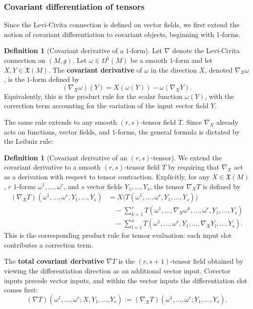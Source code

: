 \documentclass[11pt]{article}
\theoremstyle{plain}
\theoremstyle{definition}
\newtheorem{definition}[theorem]{Definition}
\theoremstyle{remark}
\begin{document}
\subsubsection{Covariant differentiation of tensors}


Since the Levi-Civita connection is defined on vector fields, we first extend
the notion of covariant differentiation to covariant objects, beginning with
1-forms.

\begin{definition}[Covariant derivative of a $1$-form]
\label{def:cov_dev_1form}
    Let $\nabla$ denote the Levi-Civita connection on $(M,g)$.  Let
    $\omega\in\Omega^1(M)$ be a smooth $1$-form and let
    $X,Y\in\mathfrak{X}(M)$.  The \textbf{covariant derivative} of
    $\omega$ in the direction $X$, denoted $\nabla_X\omega$, is the
    $1$-form defined by
    \begin{equation}
        (\nabla_X \omega)(Y) = X(\omega(Y)) - \omega(\nabla_X Y).
    \end{equation}
Equivalently, this is the product rule for the scalar function
$\omega(Y)$, with the correction term accounting for the variation of the
input vector field $Y$.
\end{definition}

The same rule extends to any smooth $(r,s)$-tensor field $T$.  Since
$\nabla_X$ already acts on functions, vector fields, and $1$-forms, the
general formula is dictated by the Leibniz rule:

\begin{definition}[Covariant derivative of an $(r,s)$-tensor]
\label{def:cov_dev_general}
    We extend the covariant derivative to a smooth $(r,s)$-tensor field $T$
    by requiring that $\nabla_X$ act as a derivation with respect to tensor
    contraction.  Explicitly, for any $X\in\mathfrak{X}(M)$, $r$
    $1$-forms $\omega^1,\dots,\omega^r$, and $s$ vector fields
    $Y_1,\dots,Y_s$, the tensor $\nabla_XT$ is defined by
    \begin{align}
        (\nabla_X T)(\omega^1, \dots, \omega^r, Y_1, \dots, Y_s) &= X \big( T(\omega^1, \dots, \omega^r, Y_1, \dots, Y_s) \big) \nonumber \\
        &\quad - \sum_{k=1}^r T(\omega^1, \dots, \nabla_X \omega^k, \dots, \omega^r, Y_1, \dots, Y_s) \nonumber \\
        &\quad - \sum_{l=1}^s T(\omega^1, \dots, \omega^r, Y_1, \dots, \nabla_X Y_l, \dots, Y_s).
    \end{align}
This is the corresponding product rule for tensor evaluation: each input
slot contributes a correction term.

    The \textbf{total covariant derivative} $\nabla T$ is the $(r,s+1)$-tensor
    field obtained by viewing the differentiation direction as an additional
    vector input.  Covector inputs precede vector inputs, and within the vector
    inputs the differentiation slot comes first:
    \begin{equation}
        (\nabla T)(\omega^1,\dots,\omega^r;X,Y_1,\dots,Y_s)
        :=(\nabla_XT)(\omega^1,\dots,\omega^r;Y_1,\dots,Y_s).
    \end{equation}
\end{definition}
\end{document}
